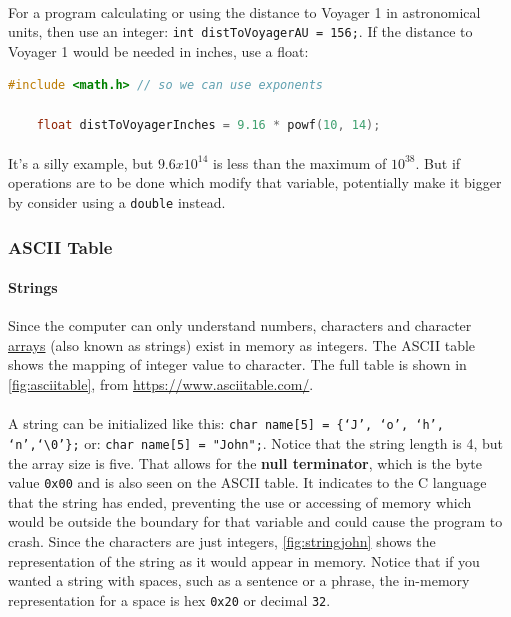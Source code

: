 \documentclass[letter,11pt]{article}
\begin{document}
\paragraph{}For a program calculating or using the distance to Voyager 1 in astronomical units, then use an integer: \texttt{int distToVoyagerAU = 156;}. If the distance to Voyager 1 would be needed in inches, use a float: 
\begin{lstlisting}[language=C,basicstyle=\footnotesize,keywordstyle=\color{blue},commentstyle=\color{green},showstringspaces=false,stringstyle=\color{red}]
    #include <math.h> // so we can use exponents

    float distToVoyagerInches = 9.16 * powf(10, 14);
\end{lstlisting}

\paragraph{}It's a silly example, but $9.6 x 10^{14}$ is less than the maximum of $10^{38}$. But if operations are to be done which modify that variable, potentially make it bigger by consider using a \texttt{double} instead.

\FloatBarrier
\subsubsection{ASCII Table}
\paragraph{Strings}Since the computer can only understand numbers, characters and character \hyperref[sec:arrays]{arrays} (also known as strings) exist in memory as integers. The ASCII table shows the mapping of integer value to character. The full table is shown in \autoref{fig:asciitable}, from \url{https://www.asciitable.com/}.

\paragraph{}A string can be initialized like this: \texttt{char name[5] = \{`J', `o', `h', `n',`\textbackslash0'\};} or: \texttt{char name[5] = "John";}. Notice that the string length is 4, but the array size is five. That allows for the \textbf{null terminator}, which is the byte value \texttt{0x00} and is also seen on the ASCII table. It indicates to the C language that the string has ended, preventing the use or accessing of memory which would be outside the boundary for that variable and could cause the program to crash. Since the characters are just integers, \autoref{fig:stringjohn} shows the representation of the string as it would appear in memory. Notice that if you wanted a string with spaces, such as a sentence or a phrase, the in-memory representation for a space is hex \texttt{0x20} or decimal \texttt{32}.
\end{document}
